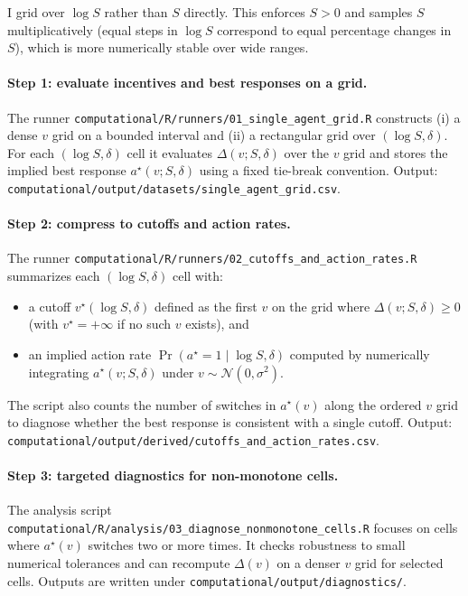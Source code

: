 I grid over $\log S$ rather than $S$ directly. This enforces $S>0$ and samples $S$ multiplicatively (equal steps in
$\log S$ correspond to equal percentage changes in $S$), which is more numerically stable over wide ranges.

\paragraph{Step 1: evaluate incentives and best responses on a grid.}
The runner \texttt{computational/R/runners/01\_single\_agent\_grid.R} constructs (i) a dense $v$ grid on a bounded
interval and (ii) a rectangular grid over $(\log S,\delta)$. For each $(\log S,\delta)$ cell it evaluates
$\Delta(v;S,\delta)$ over the $v$ grid and stores the implied best response $a^\star(v;S,\delta)$ using a fixed
tie-break convention. Output: \texttt{computational/output/datasets/single\_agent\_grid.csv}.

\paragraph{Step 2: compress to cutoffs and action rates.}
The runner \texttt{computational/R/runners/02\_cutoffs\_and\_action\_rates.R} summarizes each $(\log S,\delta)$ cell
with:
\begin{itemize}
    \item a cutoff $v^\star(\log S,\delta)$ defined as the first $v$ on the grid where $\Delta(v;S,\delta)\ge 0$
    (with $v^\star=+\infty$ if no such $v$ exists), and
    \item an implied action rate $\Pr(a^\star=1\mid \log S,\delta)$ computed by numerically integrating
    $a^\star(v;S,\delta)$ under $v\sim\mathcal{N}(0,\sigma^2)$.
\end{itemize}
The script also counts the number of switches in $a^\star(v)$ along the ordered $v$ grid to diagnose whether the best
response is consistent with a single cutoff. Output: \texttt{computational/output/derived/cutoffs\_and\_action\_rates.csv}.

\paragraph{Step 3: targeted diagnostics for non-monotone cells.}
The analysis script \texttt{computational/R/analysis/03\_diagnose\_nonmonotone\_cells.R} focuses on cells where
$a^\star(v)$ switches two or more times. It checks robustness to small numerical tolerances and can recompute
$\Delta(v)$ on a denser $v$ grid for selected cells. Outputs are written under \texttt{computational/output/diagnostics/}.


